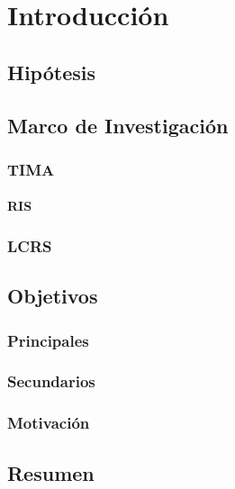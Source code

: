 \chapter{Introducción}\label{marco del trabajo}
    
    
    \section{Hipótesis}
    

    \section{Marco de Investigación}
    
        \subsection{TIMA}
        
            \subsubsection{RIS}
            
        \subsection{LCRS}
        

\section{Objetivos}

    \subsection{Principales}
    
    \subsection{Secundarios}
    
    \subsection{Motivación}
    

% 

\section{Resumen}
